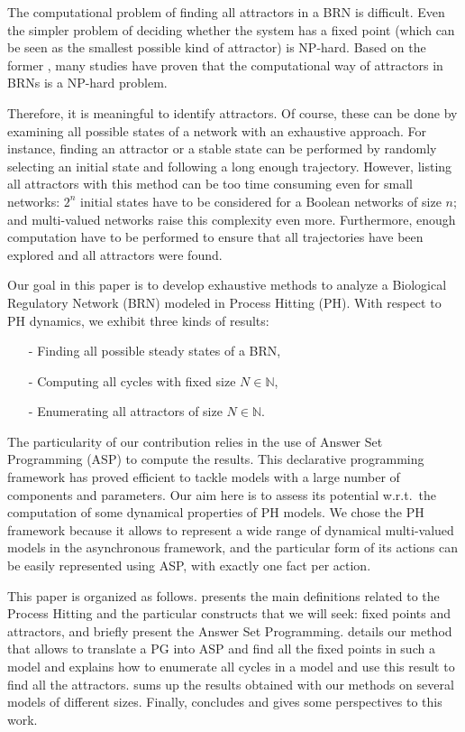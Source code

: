 
The computational problem of finding all attractors in a BRN is difficult. Even the simpler problem of deciding whether the system has a fixed point (which can be seen as the smallest possible kind of attractor) is NP-hard.
Based on the former , many studies have proven that the computational way of attractors in BRNs is a NP-hard problem. 

Therefore, it is meaningful to identify attractors. Of course, these can be done by examining all possible states of a network with an exhaustive approach. For instance, finding an attractor or a stable state can be performed by randomly selecting an initial state and following a long enough trajectory.
However, listing all attractors with this method can be too time consuming even for small networks: $2^n$ initial states have to be considered for a Boolean networks of size $n$; and multi-valued networks raise this complexity even more. Furthermore, enough computation have to be performed to ensure that all trajectories have been explored and all attractors were found.


Our goal in this paper is to develop exhaustive methods to analyze a Biological Regulatory Network (BRN) modeled in Process Hitting (PH). With respect to PH dynamics, we exhibit three kinds of results:
\begin{itemize}
\item[-] Finding all possible steady states of a BRN,
\item[-] Computing all cycles with fixed size $N \in \mathbb{N}$,
\item[-] Enumerating all attractors of size $N \in \mathbb{N}$.
\end{itemize}
The particularity of our contribution relies in the use of Answer Set Programming
(ASP) \cite{baral2003knowledge}
to compute the results.
This declarative programming framework has proved efficient
to tackle models with a large number of components and parameters.
Our aim here is to assess its potential w.r.t.\ the computation
of some dynamical properties of PH models.
We chose the PH framework because it allows to represent a wide range of dynamical multi-valued models in the asynchronous framework, and the particular form of its actions
can be easily represented using ASP,
with exactly one fact per action.

This paper is organized as follows.
 presents the main definitions related to the Process Hitting and the particular constructs that we will seek: fixed points and attractors,
and  briefly present the Answer Set Programming.
 details our method that allows to translate a PG into ASP and find all the fixed points in such a model
and  explains how to enumerate all cycles in a model and use this result to find all the attractors.
 sums up the results obtained with our methods on several models of different sizes.
Finally,  concludes and gives some perspectives to this work.
